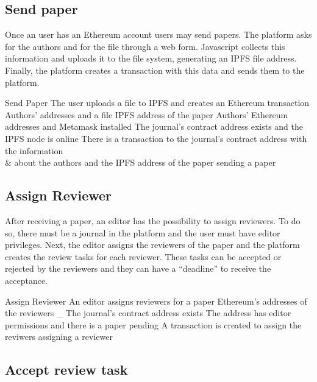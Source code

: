 \subsection*{Send paper}

Once an user has an Ethereum account users may send papers. The platform asks
for the authors and for the file through a web form. Javascript collects this
information and uploads it to the file system, generating an IPFS file address.
Finally, the platform creates a transaction with this data and sends
them to the platform.

{Send Paper}%
{The user uploads a file to IPFS and creates an Ethereum
  transaction}%
{Authors' addresses and a file}%
{IPFS address of the paper}%
{Authors' Ethereum addresses and Metamask installed}%
{The journal's contract address exists and the IPFS node is
  online}%
{There is a transaction to the journal's contract address with the information\\
  & about the authors and the IPFS address of the paper }%
{sending a paper}%

\subsection*{Assign Reviewer}

After receiving a paper, an editor has the possibility to assign reviewers. To
do so, there must be a journal in the platform and the user must have editor
privileges. Next, the editor assigns the reviewers of the paper and the platform
creates the review tasks for each reviewer. These tasks can be accepted or
rejected by the reviewers and they can have a ``deadline'' to receive the
acceptance.

{Assign Reviewer}%
{An editor assigns reviewers for a paper}%
{Ethereum's addresses of the reviewers}%
{_}%
{The journal's contract address exists} {The address has editor permissions and
  there is a paper pending}%
{A transaction is created to assign the reviwers}%
{assigning a reviewer}%

\subsection*{Accept review task}


